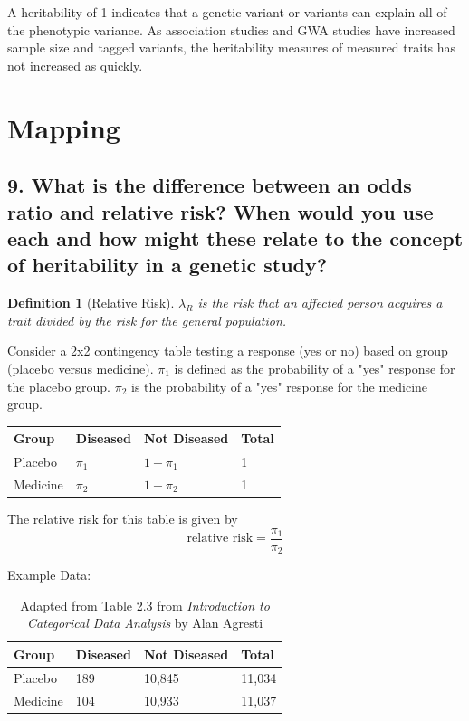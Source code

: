 \documentclass{tufte-handout}
\theoremstyle{noparens}
\newtheorem*{define}{Definition}
\begin{document}
A heritability of 1 indicates that a genetic variant or variants can explain all of the phenotypic variance. As association studies and GWA studies have increased sample size and tagged variants, the heritability measures of measured traits has not increased as quickly.

\newpage
\section{Mapping}\label{sec:map}

\subsection{9.
What is the difference between an odds ratio and relative risk? When would you use each and how might these relate to the concept of heritability in a genetic study?
}

\begin{define}[Relative Risk]
$\lambda_R$ is the risk that an affected person acquires a trait divided by the risk for the general population.
\end{define}

Consider a 2x2 contingency table testing a response (yes or no) based on group (placebo versus medicine). $\pi_1$ is defined as the probability of a "yes" response for the placebo group. $\pi_2$ is the probability of a "yes" response for the medicine group.

\begin{table}
\centering
\begin{tabular}{llll}
\toprule
Group & Diseased & Not Diseased & Total\\
\midrule
Placebo & $\pi_1$ & $1-\pi_1$ & 1\\
Medicine & $\pi_2$ & $1-\pi_2$ & 1\\
\bottomrule
\end{tabular}
\end{table}

The relative risk for this table is given by \[ \text{relative risk} = \frac{\pi_1}{\pi_2} \]

Example Data:

\begin{table}
\centering
\begin{tabular}{llll}
\toprule
Group & Diseased & Not Diseased & Total\\
\midrule
Placebo & 189 & 10,845 & 11,034\\
Medicine & 104 & 10,933 & 11,037\\
\bottomrule
\end{tabular}
\caption{Adapted from Table 2.3 from \emph{Introduction to Categorical Data Analysis} by Alan Agresti}
\end{table}
\end{document}
